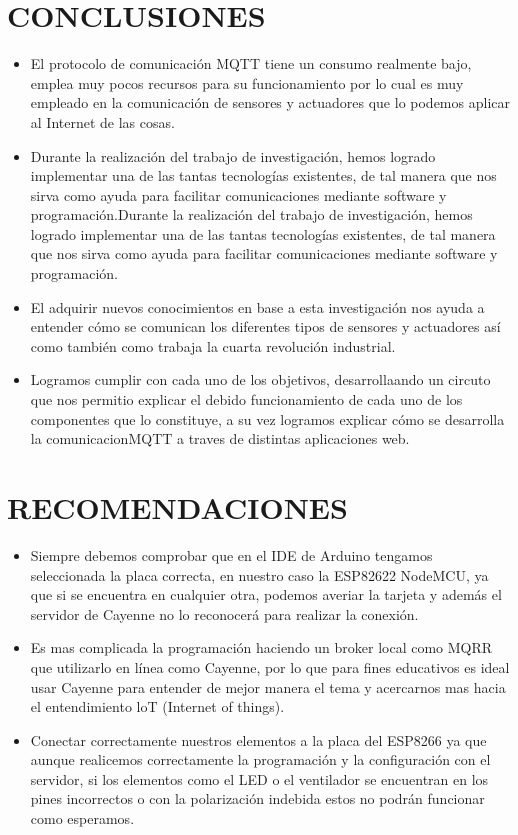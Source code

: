 \documentclass[letterpaper, 10 pt, conference]{ieeeconf}
\begin{document}
\section{CONCLUSIONES}
\begin{itemize}
    \item El protocolo de comunicación MQTT tiene un consumo realmente bajo, emplea muy pocos recursos para su funcionamiento por lo cual es muy empleado en la comunicación de sensores y actuadores que lo podemos aplicar al Internet de las cosas.
    \item Durante la realización del trabajo de investigación, hemos logrado implementar una de las tantas tecnologías existentes, de tal manera que nos sirva como ayuda para facilitar comunicaciones mediante software y programación.Durante la realización del trabajo de investigación, hemos logrado implementar una de las tantas tecnologías existentes, de tal manera que nos sirva como ayuda para facilitar comunicaciones mediante software y programación.
    \item El adquirir nuevos conocimientos en base a esta investigación nos ayuda a entender cómo se comunican los diferentes tipos de sensores y actuadores así como también como trabaja la cuarta revolución industrial.
    \item Logramos cumplir con cada uno de los objetivos, desarrollaando un circuto que nos permitio explicar el debido funcionamiento de cada uno de los componentes que lo constituye, a su vez logramos explicar cómo se desarrolla la comunicacionMQTT a traves de distintas aplicaciones web.
\end{itemize}


\addtolength{\textheight}{-12cm}   

\section{RECOMENDACIONES}
\begin{itemize}
    \item Siempre debemos comprobar que en el IDE de Arduino tengamos seleccionada la placa correcta, en nuestro caso la ESP82622 NodeMCU, ya que si se encuentra en cualquier otra, podemos averiar la tarjeta y además el servidor de Cayenne no lo reconocerá para realizar la conexión.
    \item Es mas complicada la programación haciendo un broker local como MQRR que utilizarlo en línea como Cayenne, por lo que para fines educativos es ideal usar Cayenne para entender de mejor manera el tema y acercarnos mas hacia el entendimiento loT (Internet of things).
    \item Conectar correctamente nuestros elementos a la placa del ESP8266 ya que aunque realicemos correctamente la programación y la configuración con el servidor, si los elementos como el LED o el ventilador se encuentran en los pines incorrectos o con la polarización indebida estos no podrán funcionar como esperamos.
\end{itemize}
\end{document}
